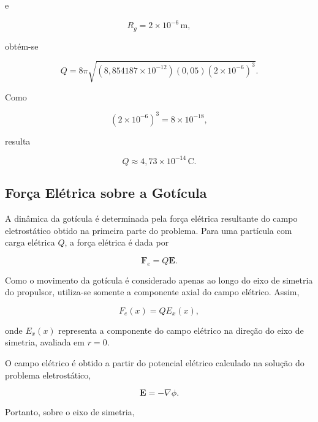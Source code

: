\documentclass[12pt,a4paper]{article}
\begin{document}
e

\begin{equation}
R_g
=
2 \times 10^{-6}\,\text{m},
\end{equation}

obtém-se

\begin{equation}
Q
=
8\pi
\sqrt{
\left(8{,}854187 \times 10^{-12}\right)
\left(0{,}05\right)
\left(2 \times 10^{-6}\right)^3
}.
\end{equation}

Como

\begin{equation}
\left(2 \times 10^{-6}\right)^3
=
8 \times 10^{-18},
\end{equation}

resulta

\begin{equation}
Q
\approx
4{,}73 \times 10^{-14}\,\text{C}.
\end{equation}

\subsection{Força Elétrica sobre a Gotícula}

A dinâmica da gotícula é determinada pela força elétrica resultante do campo
eletrostático obtido na primeira parte do problema. Para uma partícula com carga
elétrica $Q$, a força elétrica é dada por

\begin{equation}
\mathbf{F}_e
=
Q\mathbf{E}.
\end{equation}

Como o movimento da gotícula é considerado apenas ao longo do eixo de simetria
do propulsor, utiliza-se somente a componente axial do campo elétrico. Assim,

\begin{equation}
F_e(x)
=
Q E_x(x),
\end{equation}

onde $E_x(x)$ representa a componente do campo elétrico na direção do eixo de
simetria, avaliada em $r=0$.

O campo elétrico é obtido a partir do potencial elétrico calculado na solução
do problema eletrostático,

\begin{equation}
\mathbf{E}
=
-\nabla \phi.
\end{equation}

Portanto, sobre o eixo de simetria,
\end{document}
